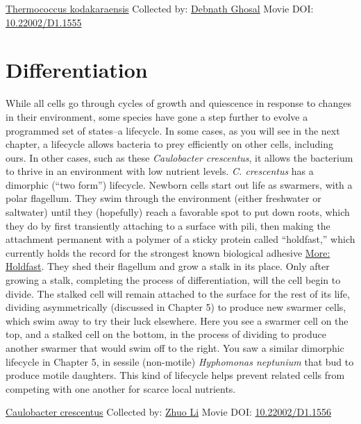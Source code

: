 \documentclass[]{tufte-book}
\begin{document}
\hypertarget{htmlwidget-48f345ee4ffd4655cc7d}{}

\label{fig:8-3}\protect\hyperlink{tree}{Thermococcus kodakaraensis} Collected by: \protect\hyperlink{debnath_ghosal}{Debnath Ghosal} Movie DOI: \href{https://doi.org/10.22002/D1.1555}{10.22002/D1.1555}

\hypertarget{differentiation}{%
\section{Differentiation}\label{differentiation}}

While all cells go through cycles of growth and quiescence in response to changes in their environment, some species have gone a step further to evolve a programmed set of states--a lifecycle. In some cases, as you will see in the next chapter, a lifecycle allows bacteria to prey efficiently on other cells, including ours. In other cases, such as these \emph{Caulobacter crescentus}, it allows the bacterium to thrive in an environment with low nutrient levels. \emph{C. crescentus} has a dimorphic (``two form'') lifecycle. Newborn cells start out life as swarmers, with a polar flagellum. They swim through the environment (either freshwater or saltwater) until they (hopefully) reach a favorable spot to put down roots, which they do by first transiently attaching to a surface with pili, then making the attachment permanent with a polymer of a sticky protein called ``holdfast,'' which currently holds the record for the strongest known biological adhesive \protect\hyperlink{Holdfast}{More: Holdfast}. They shed their flagellum and grow a stalk in its place. Only after growing a stalk, completing the process of differentiation, will the cell begin to divide. The stalked cell will remain attached to the surface for the rest of its life, dividing asymmetrically (discussed in Chapter 5) to produce new swarmer cells, which swim away to try their luck elsewhere. Here you see a swarmer cell on the top, and a stalked cell on the bottom, in the process of dividing to produce another swarmer that would swim off to the right. You saw a similar dimorphic lifecycle in Chapter 5, in sessile (non-motile) \emph{Hyphomonas neptunium} that bud to produce motile daughters. This kind of lifecycle helps prevent related cells from competing with one another for scarce local nutrients.



\hypertarget{htmlwidget-3da010bdfc595c678be0}{}

\label{fig:8-4}\protect\hyperlink{tree}{Caulobacter crescentus} Collected by: \protect\hyperlink{zhuo_li}{Zhuo Li} Movie DOI: \href{https://doi.org/10.22002/D1.1556}{10.22002/D1.1556}
\end{document}
